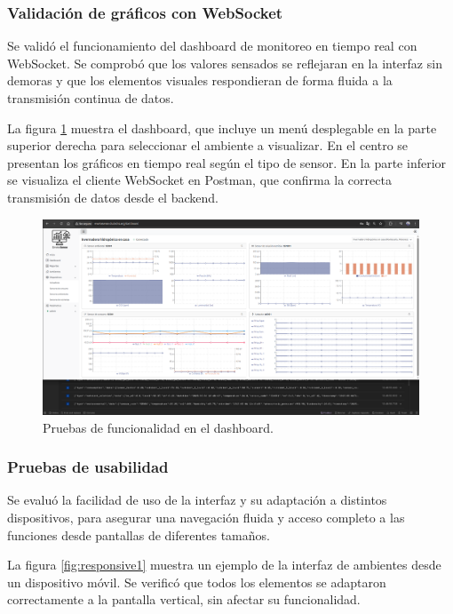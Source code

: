 \subsubsection{Validación de gráficos con WebSocket}

Se validó el funcionamiento del dashboard de monitoreo en tiempo real con
WebSocket. Se comprobó que los valores sensados se reflejaran en la interfaz
sin demoras y que los elementos visuales respondieran de forma fluida a la
transmisión continua de datos.

La figura \ref{fig:dashboard} muestra el dashboard, que incluye un menú
desplegable en la parte superior derecha para seleccionar el ambiente a
visualizar. En el centro se presentan los gráficos en tiempo real según el tipo
de sensor. En la parte inferior se visualiza el cliente WebSocket en Postman,
que confirma la correcta transmisión de datos desde el backend.

\begin{figure}[H]
    \centering
    \includegraphics[width=\textwidth]{Images/47_dashboard.png}
    \caption[Pruebas de funcionalidad en el dashboard]{Pruebas de funcionalidad en el dashboard.}
    \label{fig:dashboard}
\end{figure}

\subsubsection{Pruebas de usabilidad}

Se evaluó la facilidad de uso de la interfaz y su adaptación a distintos
dispositivos, para asegurar una navegación fluida y acceso completo a las
funciones desde pantallas de diferentes tamaños.

La figura \ref{fig:responsive1} muestra un ejemplo de la interfaz de ambientes
desde un dispositivo móvil. Se verificó que todos los elementos se adaptaron
correctamente a la pantalla vertical, sin afectar su funcionalidad.

